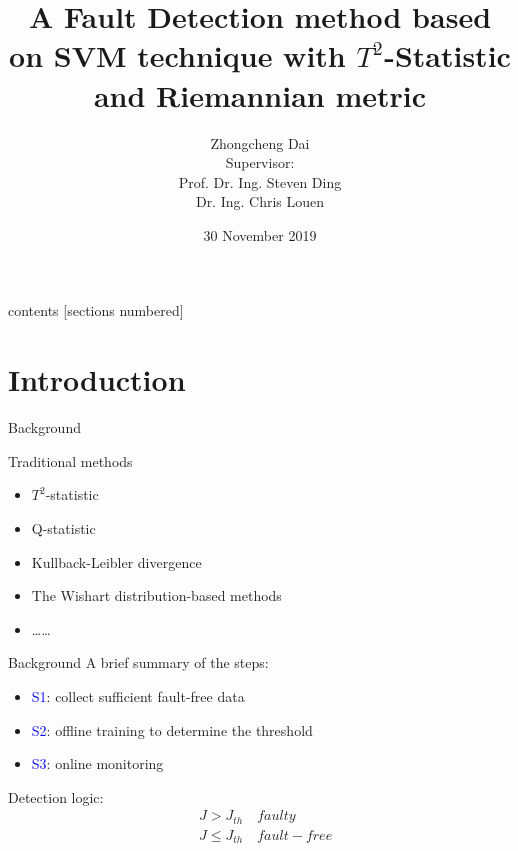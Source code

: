 \documentclass[10pt]{beamer}
\title{A Fault Detection method based on SVM technique with $T^2$-Statistic and Riemannian metric}
\author{Zhongcheng Dai  \\
 Supervisor: \\
 Prof. Dr. Ing. Steven Ding\\
Dr. Ing. Chris Louen 
}
\date{30 November 2019}
\institute{Automatic Control and Complex Systems}
\begin{document}
\maketitle
\begin{frame}{contents}
  [sections numbered]
  \tableofcontents[hideallsubsections]
\end{frame}
\section{Introduction}
\begin{frame}{Background}
    \begin{exampleblock}{Traditional methods}
	\begin{itemize}
    \item $T^2$-statistic
    \item Q-statistic
    \item Kullback-Leibler divergence
    \item The Wishart distribution-based methods
    \item \dots \dots
    \end{itemize}
    \end{exampleblock}
\end{frame}
\begin{frame}{Background}
 A brief summary of the steps:
      \begin{itemize}
      \item \textcolor{blue}{S1}: collect sufficient fault-free data
      \item \textcolor{blue}{S2}: offline training to determine the threshold
      \item \textcolor{blue}{S3}: online monitoring  %
 	 \end{itemize}  
 Detection logic:
 \begin{equation}\nonumber
 \begin{aligned}
     &J > J_{th} \quad faulty \\
     &J \leq J_{th} \quad fault-free \\
     \end{aligned}
 \end{equation}
\end{frame}
\end{document}
